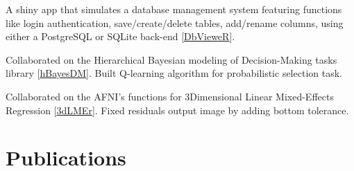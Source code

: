 \documentclass[]{plushcv}
\begin{document}
\begin{minipage}[t]{0.70\textwidth}
\begin{tightemize}
\item A shiny app that simulates a database management system featuring functions like login authentication, save/create/delete tables, add/rename columns, using either a PostgreSQL or SQLite back-end [\href{https://github.com/Andres-AM/DBMS}{\underline{DbVieweR}}].
\end{tightemize}
\sectionsep
{}
\begin{tightemize}
\item Collaborated on the Hierarchical Bayesian modeling of Decision-Making tasks library [\href{https://github.com/CCS-Lab/hBayesDM}{\underline{hBayesDM}}]. Built Q-learning algorithm for probabilistic selection task.
\end{tightemize}
\sectionsep



\begin{tightemize}
\item Collaborated on the AFNI's functions for 3Dimensional Linear Mixed-Effects Regression [\href{https://github.com/afni/afni/blob/ebd2aef51c27cf7684f38f580e1db832b1ccf621/src/R_scripts/3dLMEr.R}{\underline{3dLMEr}}]. Fixed residuals output image by adding bottom tolerance.
\end{tightemize}
\sectionsep






\section{Publications} 



\end{minipage}
\end{document}
